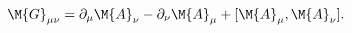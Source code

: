 \begin{equation}
\M{G}_{\mu\nu} = \partial_{\mu}\M{A}_{\nu}-\partial_{\nu}\M{A}_{\mu}+[\M{A}_{\mu},\M{A}_{\nu}] .
\label{2.22d}
\end{equation}


